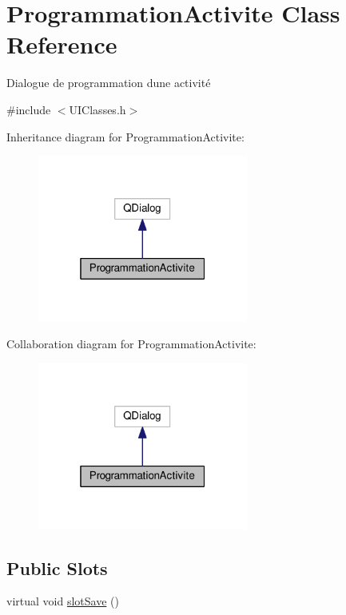 \hypertarget{class_programmation_activite}{}\section{Programmation\+Activite Class Reference}
\label{class_programmation_activite}


Dialogue de programmation d\textquotesingle{}une activité  




{\ttfamily \#include $<$U\+I\+Classes.\+h$>$}



Inheritance diagram for Programmation\+Activite\+:\nopagebreak
\begin{figure}[H]
\begin{center}
\leavevmode
\includegraphics[width=196pt]{class_programmation_activite__inherit__graph}
\end{center}
\end{figure}


Collaboration diagram for Programmation\+Activite\+:\nopagebreak
\begin{figure}[H]
\begin{center}
\leavevmode
\includegraphics[width=196pt]{class_programmation_activite__coll__graph}
\end{center}
\end{figure}
\subsection*{Public Slots}
\begin{DoxyCompactItemize}
\item 
virtual void \hyperlink{class_programmation_activite_a411643dc5f9fc094a834b38e85472503}{slot\+Save} ()
\end{DoxyCompactItemize}
